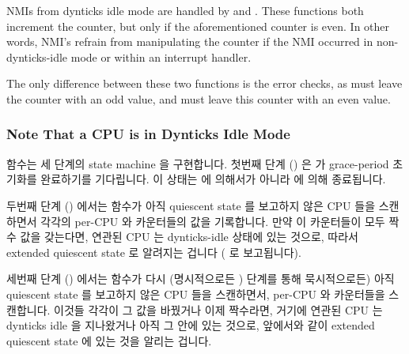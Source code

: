 NMIs from dynticks idle mode are handled by 
and .
These functions both increment the  counter,
but only if the aforementioned  counter is even.
In other words, NMI's refrain from manipulating the
 counter if the NMI occurred in non-dynticks-idle
mode or within an interrupt handler.

The only difference between these two functions is the error checks,
as  must leave the 
counter with an odd value, and  must leave
this counter with an even value.
\fi

\subsubsection{Note That a CPU is in Dynticks Idle Mode}
\label{app:rcuimpl:rcutree:Note That a CPU is in Dynticks Idle Mode}

 함수는 세 단계의 state machine 을 구현합니다.
첫번째 단계 () 은  가 grace-period
초기화를 완료하기를 기다립니다.
이 상태는  에 의해서가 아니라 
에 의해 종료됩니다.

두번째 단계 () 에서는 
함수가 아직 quiescent state 를 보고하지 않은 CPU 들을 스캔하면서 각각의 per-CPU
 와  카운터들의 값을 기록합니다.
만약 이 카운터들이 모두 짝수 값을 갖는다면, 연관된 CPU 는 dynticks-idle 상태에
있는 것으로, 따라서 extended quiescent state 로 알려지는 겁니다
( 로 보고됩니다).
\iffalse

The \co{force_quiescent_state()} function implements a
three-phase state machine.
The first phase (\co{RCU_INITIALIZING}) waits for \co{rcu_start_gp()}
to complete grace-period initialization.
This state is not exited by \co{force_quiescent_state()}, but rather
by \co{rcu_start_gp()}.

In the second phase (\co{RCU_SAVE_DYNTICK}), the
\co{dyntick_save_progress_counter()} function scans the CPUs that
have not yet reported a quiescent state, recording their per-CPU
\co{dynticks} and \co{dynticks_nmi} counters.
If these counters both have even-numbered values, then the corresponding
CPU is in dynticks-idle state, which is therefore noted as an extended
quiescent state (reported via \co{cpu_quiet_msk()}).
\fi

세번째 단계 () 에서는  함수가
다시 (명시적으로든 ) 단계를 통해 묵시적으로든) 아직
quiescent state 를 보고하지 않은 CPU 들을 스캔하면서, per-CPU  와
 카운터들을 스캔합니다.
이것들 각각이 그 값을 바꿨거나 이제 짝수라면, 거기에 연관된 CPU 는 dynticks
idle 을 지나왔거나 아직 그 안에 있는 것으로, 앞에서와 같이 extended quiescent
state 에 있는 것을 알리는 겁니다.

